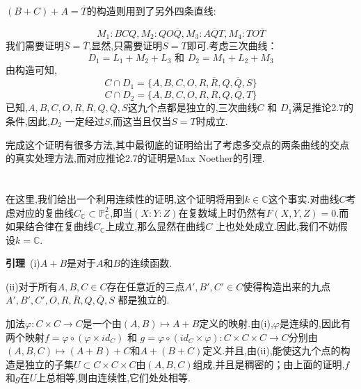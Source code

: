 \documentclass[UTF8]{book}
\begin{document}
		$(B+C)+A=\overline{T}$的构造则用到了另外四条直线:
		
		\begin{equation*}
			M_{1}:BCQ,M_{2}:QO\overline{Q},M_{3}:A\overline{Q}T,M_{4}:TO\overline{T}
		\end{equation*}
		我们需要证明$\overline{S}=\overline{T}$,显然,只需要证明$S=T$即可.考虑三次曲线：
		\begin{equation*}
		D_{1}=L_{1}+M_{2}+L_{3} \text { 和 }D_{2}=M_{1}+L_{2}+M_{3}
		\end{equation*}
		由构造可知,
		\begin{equation*}
		C \cap D_{1}=\{A, B, C, O,R, \overline{R}, Q, \overline{Q}, S\}
		\end{equation*}
		\begin{equation*}
		C \cap D_{2}=\{A, B, C, O,R, \overline{R}, Q, \overline{Q}, T\}
		\end{equation*}
		已知,$ A, B, C, O,R, \overline{R}, Q, \overline{Q}, S $这九个点都是独立的,三次曲线$ C $ 和 $ D_{1} $满足推论2.7的条件,因此,$ D_{2} $ 一定经过$ S $,而这当且仅当$S=T$时成立.
		
		
		完成这个证明有很多方法,其中最彻底的证明给出了考虑多交点的两条曲线的交点的真实处理方法,而对应推论2.7的证明是Max Noether的引理.
		
	\section{}
		在这里,我们给出一个利用连续性的证明,这个证明将用到$ k \in \mathbb{C} $这个事实.对曲线$ C $考虑对应的复曲线$C_{\mathbb{C}} \subset \mathbb{P}^{2}_\mathbb{C}$,即当$ (X:Y:Z) $在复数域上时仍然有$ F(X,Y,Z)=0 $.而如果结合律在复曲线$ C_{\mathbb{C}} $上成立,那么显然在曲线$ C $ 上也处处成立.因此,我们不妨假设$ k = \mathbb{C} $.
		
		\textbf{引理}\ (i)$ A+B $是对于$ A $和$ B $的连续函数.
		
		
		(ii)对于所有$ A,B,C \in C $存在任意近的三点$ A',B',C' \in C $使得构造出来的九点$ A', B', C', O,R, \overline{R}, Q, \overline{Q}, S $ 都是独立的.
		
		
		加法$\varphi: C \times C \rightarrow C$是一个由$(A, B) \mapsto A+B$定义的映射.由(i),$ \varphi $是连续的,因此有两个映射$f=\varphi \circ(\varphi \times id_{C})$  和  $g=\varphi \circ(id_{C} \times \varphi): C \times C \times C \rightarrow C$分别由$(A, B,C) \mapsto (A+B)+C$和$ A+(B+C )$定义.并且,由(ii),能使这九个点的构造是独立的子集$ U \subset C \times C \times C  $由$ (A,B,C) $组成,并且是稠密的；由上面的证明,$ f $和$ g $在$ U $上总相等,则由连续性,它们处处相等.
		
\end{document}
